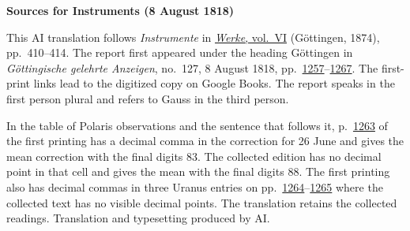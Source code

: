 \clearpage\thispagestyle{empty}
\begin{center}\textbf{Sources for Instruments (8 August 1818)}\end{center}
\noindent This AI translation follows \textit{Instrumente} in \href{https://gdz.sub.uni-goettingen.de/id/PPN236007467}{\textit{Werke}, vol.~VI} (Göttingen, 1874), pp.~410--414. The report first appeared under the heading Göttingen in \textit{Göttingische gelehrte Anzeigen}, no.~127, 8 August 1818, pp.~\href{https://books.google.com/books?id=Uy1ZAAAAcAAJ&pg=PA1257}{1257}--\href{https://books.google.com/books?id=Uy1ZAAAAcAAJ&pg=PA1267}{1267}. The first-print links lead to the digitized copy on Google Books. The report speaks in the first person plural and refers to Gauss in the third person.
\par\smallskip\noindent In the table of Polaris observations and the sentence that follows it, p.~\href{https://books.google.com/books?id=Uy1ZAAAAcAAJ&pg=PA1263}{1263} of the first printing has a decimal comma in the correction for 26 June and gives the mean correction with the final digits 83. The collected edition has no decimal point in that cell and gives the mean with the final digits 88. The first printing also has decimal commas in three Uranus entries on pp.~\href{https://books.google.com/books?id=Uy1ZAAAAcAAJ&pg=PA1264}{1264}--\href{https://books.google.com/books?id=Uy1ZAAAAcAAJ&pg=PA1265}{1265} where the collected text has no visible decimal points. The translation retains the collected readings. Translation and typesetting produced by AI.
\clearpage

